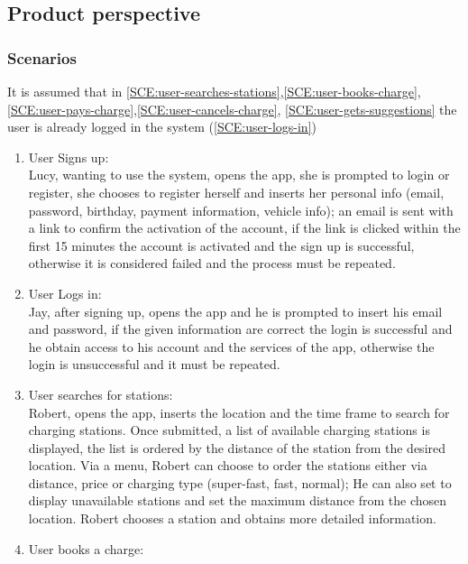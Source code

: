 \subsection{Product perspective}

\subsubsection{Scenarios}
It is assumed that in \ref{SCE:user-searches-stations},\ref{SCE:user-books-charge},\ref{SCE:user-pays-charge},\ref{SCE:user-cancels-charge}, \ref{SCE:user-gets-suggestions} the user is already logged in the system (\ref{SCE:user-logs-in})
\begin{enumerate}[label=\textbf{S\arabic*}]
      \item User Signs up:\\
            Lucy, wanting to use the system, opens the app, she is prompted to login or register,
            she chooses to register herself and inserts her personal info (email, password, birthday, payment information, vehicle info);
            an email is sent with a link to confirm the activation of the account, if the link is clicked within
            the first 15 minutes the account is activated and the sign up is successful,
            otherwise it is considered failed and the process must be repeated.\label{SCE:user-signs-up}
      \item User Logs in:\\
            Jay, after signing up, opens the app and he is prompted to insert his email and password,
            if the given information are correct the login is successful and he obtain access to his account
            and the services of the app, otherwise the login is unsuccessful and it must be repeated.\label{SCE:user-logs-in}
      \item User searches for stations:\\
            Robert, opens the app, inserts the location and the time frame to search for charging stations.
            Once submitted, a list of available charging stations is displayed, the list is ordered by the distance of the station
            from the desired location. Via a menu, Robert can choose to order the stations either via distance, price or charging type (super-fast, fast, normal); He can also set to display unavailable stations and set the maximum distance from the chosen location.\label{SCE:user-searches-stations}
            Robert chooses a station and obtains more detailed information.
      \item User books a charge:\\

\end{enumerate}
